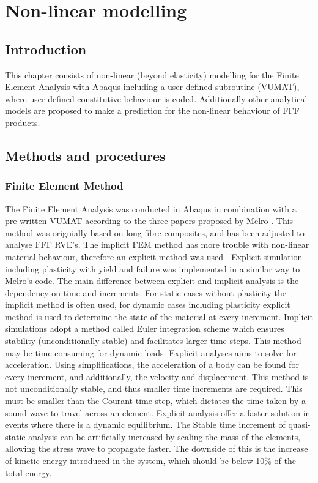 \chapter{Non-linear modelling}
\label{chp:7}

\section{Introduction}
This chapter consists of  non-linear (beyond elasticity) modelling for the Finite Element Analysis with Abaqus including a user defined subroutine (VUMAT), where user defined constitutive behaviour is coded. Additionally other analytical models are proposed to make a prediction for the non-linear behaviour of FFF products. 

\section{Methods and procedures}
\subsection{Finite Element Method}
The Finite Element Analysis was conducted in Abaqus in combination with a pre-written VUMAT according to the three papers proposed by Melro \cite{Melro2012InfluenceMaterials}\cite{Melro2013}\cite{Melro2013MicromechanicalModelling}. This method was orignially based on long fibre composites, and has been adjusted to analyse FFF RVE's. The implicit FEM method has more trouble with non-linear material behaviour, therefore an explicit method was used \cite{Harish2019ImplicitMethod}.
Explicit simulation including plasticity with yield and failure was implemented in a similar way to Melro's code. The main difference between explicit and implicit analysis is the dependency on time and increments. For static cases without plasticity the implicit method is often used, for dynamic cases including plasticity explicit method is used to determine the state of the material at every increment. Implicit simulations adopt a method called Euler integration scheme which ensures stability (unconditionally stable) and facilitates larger time steps. This method may be time consuming for dynamic loads.  Explicit analyses aims to solve for acceleration. Using simplifications, the acceleration of a body can be found for every increment, and additionally, the velocity and displacement. This method is not unconditionally stable, and thus smaller time increments are required. This must be smaller than the Courant time step, which dictates the time taken by a sound wave to travel across an element. Explicit analysis offer a faster solution in events where there is a dynamic equilibrium.  The Stable time increment of quasi-static analysis can be artificially increased by scaling the mass of the elements, allowing the stress wave to propagate faster. The downside of this is the increase of kinetic energy introduced in the system, which should be below 10\% of the total energy.  

